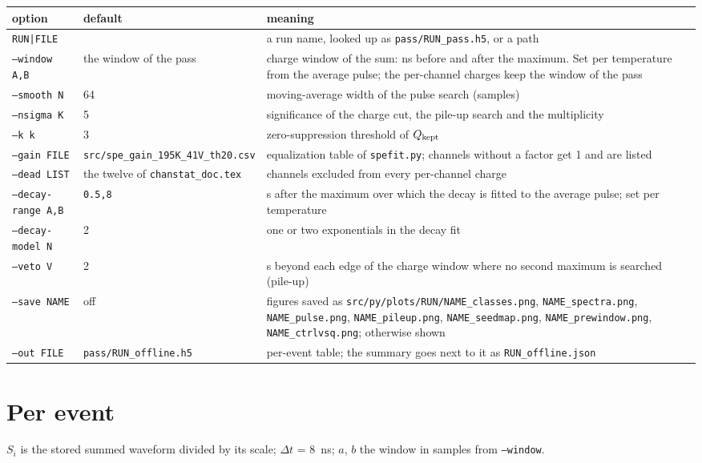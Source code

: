 \documentclass[11pt]{article}
\newcommand{\code}[1]{\texttt{#1}}
\newcommand{\us}{\textmu s}
\begin{document}
\begin{center}
\begin{tabular}{l l p{72mm}}
\toprule
option & default & meaning \\
\midrule
\code{RUN|FILE} & & a run name, looked up as \code{pass/RUN\_pass.h5}, or a path \\
\code{--window A,B} & the window of the pass & charge window of the sum: ns before and after the maximum. Set per temperature from the average pulse; the per-channel charges keep the window of the pass \\
\code{--smooth N} & 64 & moving-average width of the pulse search (samples) \\
\code{--nsigma K} & 5 & significance of the charge cut, the pile-up search and the multiplicity \\
\code{--k k} & 3 & zero-suppression threshold of $Q_{\rm kept}$ \\
\code{--gain FILE} & \code{src/spe\_gain\_195K\_41V\_th20.csv} & equalization table of \code{spefit.py}; channels without a factor get 1 and are listed \\
\code{--dead LIST} & the twelve of \code{chanstat\_doc.tex} & channels excluded from every per-channel charge \\
\code{--decay-range A,B} & \code{0.5,8} & \us{} after the maximum over which the decay is fitted to the average pulse; set per temperature \\
\code{--decay-model N} & 2 & one or two exponentials in the decay fit \\
\code{--veto V} & 2 & \us{} beyond each edge of the charge window where no second maximum is searched (pile-up) \\
\code{--save NAME} & off & figures saved as \code{src/py/plots/RUN/NAME\_classes.png}, \code{NAME\_spectra.png}, \code{NAME\_pulse.png}, \code{NAME\_pileup.png}, \code{NAME\_seedmap.png}, \code{NAME\_prewindow.png}, \code{NAME\_ctrlvsq.png}; otherwise shown \\
\code{--out FILE} & \code{pass/RUN\_offline.h5} & per-event table; the summary goes next to it as \code{RUN\_offline.json} \\
\bottomrule
\end{tabular}
\end{center}

\section{Per event}

$S_i$ is the stored summed waveform divided by its scale; $\Delta t$ = 8~ns;
$a$, $b$ the window in samples from \code{--window}.
\end{document}
